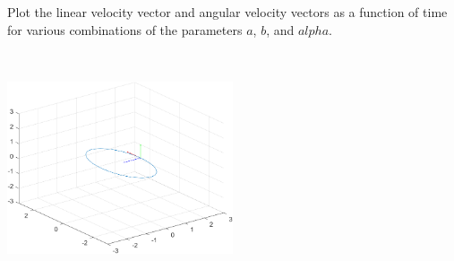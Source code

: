 Plot the linear velocity vector and angular velocity vectors as a function of time for various combinations of the parameters
$a$, $b$, and $alpha$.

\begin{solution}\
\begin{center}
    \includegraphics[width=0.5\textwidth]{img/e2p7.png}
\end{center}
\end{solution}